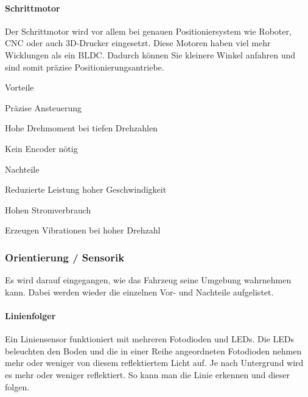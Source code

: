 \paragraph{Schrittmotor}

Der Schrittmotor wird vor allem bei genauen Positioniersystem wie Roboter, CNC oder auch 3D-Drucker eingesetzt. Diese Motoren haben viel mehr Wicklungen als ein BLDC. Dadurch können Sie kleinere Winkel anfahren und sind somit präzise Positionierungsantriebe. 

\begin{minipage}[t]{0.48\textwidth}
\begin{items}
  \item [Vorteile]
  \item Präzise Ansteuerung
  \item Hohe Drehmoment bei tiefen Drehzahlen
  \item Kein Encoder nötig
\end{items}
\end{minipage}
\hfill
\begin{minipage}[t]{0.48\textwidth}
\begin{items}
  \item [Nachteile]
  \item Reduzierte Leistung hoher Geschwindigkeit
  \item Hohen Stromverbrauch
  \item Erzeugen Vibrationen bei hoher Drehzahl
\end{items}
\end{minipage}

\subsubsection{Orientierung / Sensorik}

Es wird darauf eingegangen, wie das Fahrzeug seine Umgebung wahrnehmen kann. Dabei werden wieder die einzelnen Vor- und Nachteile aufgelistet.

\paragraph{Linienfolger}
Ein Liniensensor funktioniert mit mehreren Fotodioden und LEDs. Die LEDs beleuchten den Boden und die in einer Reihe angeordneten Fotodioden nehmen mehr oder weniger von diesem reflektiertem Licht auf. Je nach Untergrund wird es mehr oder weniger reflektiert. So kann man die Linie erkennen und dieser folgen.
 

